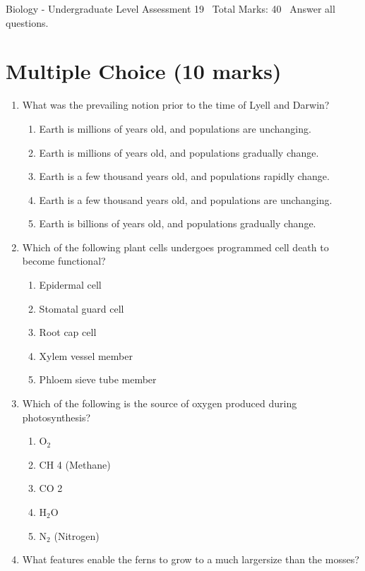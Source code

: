 \documentclass[12pt]{article}
\begin{document}
\begin{center}
Biology - Undergraduate Level Assessment 19 \
Total Marks: 40 \
Answer all questions.
\end{center}

\section*{Multiple Choice (10 marks)}
\begin{enumerate}[label=\arabic*.]
\item What was the prevailing notion prior to the time of Lyell and Darwin?
\begin{enumerate}[label=(\alph*)]
    \item Earth is millions of years old, and populations are unchanging.
    \item Earth is millions of years old, and populations gradually change.
    \item Earth is a few thousand years old, and populations rapidly change.
    \item Earth is a few thousand years old, and populations are unchanging.
    \item Earth is billions of years old, and populations gradually change.
\end{enumerate}
\item Which of the following plant cells undergoes programmed cell death to become functional?
\begin{enumerate}[label=(\alph*)]
    \item Epidermal cell
    \item Stomatal guard cell
    \item Root cap cell
    \item Xylem vessel member
    \item Phloem sieve tube member
\end{enumerate}
\item Which of the following is the source of oxygen produced during photosynthesis?
\begin{enumerate}[label=(\alph*)]
    \item O$_{2}$
    \item CH 4 (Methane)
    \item CO 2
    \item H$_{2}$O
    \item N$_{2}$ (Nitrogen)
\end{enumerate}
\item What features enable the ferns to grow to a much largersize than the mosses?

\end{enumerate}
\end{document}
